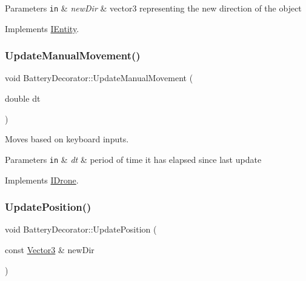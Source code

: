 \begin{DoxyParams}[1]{Parameters}
\mbox{\tt in}  & {\em new\+Dir} & vector3 representing the new direction of the object \\
\hline
\end{DoxyParams}


Implements \hyperlink{classIEntity_af24054e349dcdaea31a778427a34495d}{I\+Entity}.

\mbox{\label{classBatteryDecorator_a45babf9bc5484acb95701d361e89de9b}} 
\subsubsection{\texorpdfstring{Update\+Manual\+Movement()}{UpdateManualMovement()}}
{\footnotesize\ttfamily void Battery\+Decorator\+::\+Update\+Manual\+Movement (\begin{DoxyParamCaption}\item[{double}]{dt }\end{DoxyParamCaption})\hspace{0.3cm}{\ttfamily [virtual]}}



Moves based on keyboard inputs. 


\begin{DoxyParams}[1]{Parameters}
\mbox{\tt in}  & {\em dt} & period of time it has elapsed since last update \\
\hline
\end{DoxyParams}


Implements \hyperlink{classIDrone_a82486b4192f6ccf8b3d93fbb9101f2dd}{I\+Drone}.

\mbox{\label{classBatteryDecorator_a7c338ca278f03c5c0fcea39885fc7d43}} 
\subsubsection{\texorpdfstring{Update\+Position()}{UpdatePosition()}}
{\footnotesize\ttfamily void Battery\+Decorator\+::\+Update\+Position (\begin{DoxyParamCaption}\item[{const \hyperlink{classVector3}{Vector3} \&}]{new\+Dir }\end{DoxyParamCaption})\hspace{0.3cm}{\ttfamily [virtual]}}



